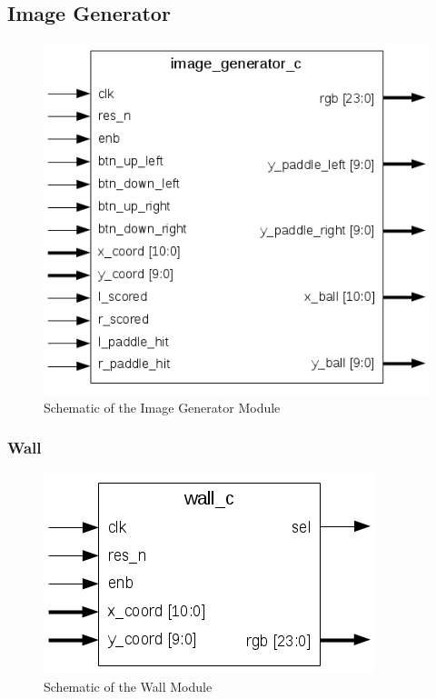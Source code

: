     \subsection{Image Generator}
	    \begin{figure}[here]
		    \centering
		    \includegraphics[scale=0.7]{images/image_generator_schematic.png}
		    \caption{Schematic of the Image Generator Module}
		    \label{img_gen_sch}
	    \end{figure}

        \subsubsection{Wall}
	        \begin{figure}[here]
		        \centering
		        \includegraphics[scale=0.7]{images/wall_schematic.png}
		        \caption{Schematic of the Wall Module}
		        \label{wall_sch}
	        \end{figure}
